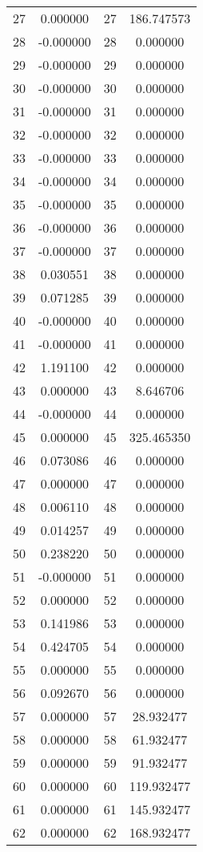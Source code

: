 \documentclass[12pt]{article}
\begin{document}
\begin{longtable}{@{}cccc@{}}
27 & 0.000000 & 27 & 186.747573 \\
28 & -0.000000 & 28 & 0.000000 \\
29 & -0.000000 & 29 & 0.000000 \\
30 & -0.000000 & 30 & 0.000000 \\
31 & -0.000000 & 31 & 0.000000 \\
32 & -0.000000 & 32 & 0.000000 \\
33 & -0.000000 & 33 & 0.000000 \\
34 & -0.000000 & 34 & 0.000000 \\
35 & -0.000000 & 35 & 0.000000 \\
36 & -0.000000 & 36 & 0.000000 \\
37 & -0.000000 & 37 & 0.000000 \\
38 & 0.030551 & 38 & 0.000000 \\
39 & 0.071285 & 39 & 0.000000 \\
40 & -0.000000 & 40 & 0.000000 \\
41 & -0.000000 & 41 & 0.000000 \\
42 & 1.191100 & 42 & 0.000000 \\
43 & 0.000000 & 43 & 8.646706 \\
44 & -0.000000 & 44 & 0.000000 \\
45 & 0.000000 & 45 & 325.465350 \\
46 & 0.073086 & 46 & 0.000000 \\
47 & 0.000000 & 47 & 0.000000 \\
48 & 0.006110 & 48 & 0.000000 \\
49 & 0.014257 & 49 & 0.000000 \\
50 & 0.238220 & 50 & 0.000000 \\
51 & -0.000000 & 51 & 0.000000 \\
52 & 0.000000 & 52 & 0.000000 \\
53 & 0.141986 & 53 & 0.000000 \\
54 & 0.424705 & 54 & 0.000000 \\
55 & 0.000000 & 55 & 0.000000 \\
56 & 0.092670 & 56 & 0.000000 \\
57 & 0.000000 & 57 & 28.932477 \\
58 & 0.000000 & 58 & 61.932477 \\
59 & 0.000000 & 59 & 91.932477 \\
60 & 0.000000 & 60 & 119.932477 \\
61 & 0.000000 & 61 & 145.932477 \\
62 & 0.000000 & 62 & 168.932477 \\

\end{longtable}
\end{document}
